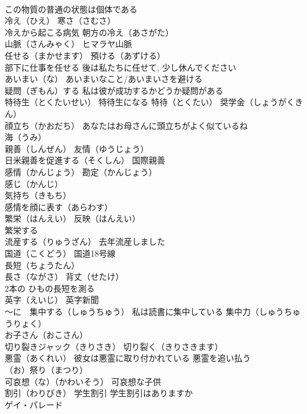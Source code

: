\documentclass[8pt]{extreport}
\begin{document}
\begin{CJK}{UTF8}{min}
\\	この物質の普通の状態は個体である
\\	冷え（ひえ） 寒さ（さむさ）
\\	冷えから起こる病気 朝方の冷え（あさがた）
\\	山脈（さんみゃく） ヒマラヤ山脈
\\	任せる（まかせます） 預ける（あずける）
\\	部下に仕事を任せる 後は私たちに任せて, 少し休んでください
\\	あいまい（な） あいまいなこと/あいまいさを避ける
\\	疑問（ぎもん）する 私は彼が成功するかどうか疑問がある
\\	特待生（とくたいせい） 特待生になる 特待（とくたい） 奨学金（しょうがくきん）
\\	顔立ち（かおだち） あなたはお母さんに頭立ちがよく似ているね
\\	海（うみ）
\\	親善（しんぜん） 友情（ゆうじょう）
\\	日米親善を促進する（そくしん） 国際親善
\\	感情（かんじょう） 勘定（かんじょう）
\\	感じ（かんじ）
\\	気持ち（きもち）
\\	感情を顔に表す（あらわす）
\\	繁栄（はんえい） 反映（はんえい）
\\	繁栄する
\\	流産する（りゅうざん） 去年流産しました
\\	国道（こくどう） 国道18号線
\\	長短（ちょうたん）
\\	長さ（ながさ） 背丈（せたけ）
\\	2本の ひもの長短を測る
\\	英字（えいじ） 英字新聞
\\	～に　集中する（しゅうちゅう） 私は読書に集中している 集中力（しゅうちゅうりょく）
\\	お子さん（おこさん）
\\	切り裂きジャック（きりさき） 切り裂く（きりさきます）
\\	悪霊（あくれい） 彼女は悪霊に取り付かれている 悪霊を追い払う
\\	（お）祭り（まつり）
\\	可哀想（な）（かわいそう） 可哀想な子供
\\	割引（わりびき） 学生割引 学生割引はありますか
\\	ゲイ・パレード

\end{CJK}
\end{document}
